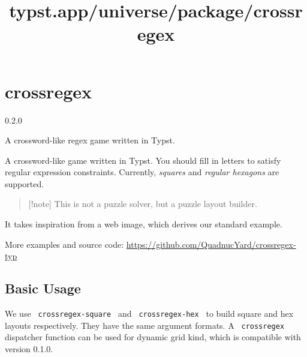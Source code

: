 \title{typst.app/universe/package/crossregex}

\label{banner}
\section{crossregex}\label{crossregex}

{ 0.2.0 }

A crossword-like regex game written in Typst.

\label{readme}
A crossword-like game written in Typst. You should fill in letters to
satisfy regular expression constraints. Currently, \emph{squares} and
\emph{regular hexagons} are supported.

\begin{quote}
{[}!note{]} This is not a puzzle solver, but a puzzle layout builder.
\end{quote}

It takes inspiration from a web image, which derives our standard
example.

\pandocbounded{}

\pandocbounded{}

More examples and source code:
\url{https://github.com/QuadnucYard/crossregex-typ}

\subsection{Basic Usage}\label{basic-usage}

We use \texttt{\ crossregex-square\ } and \texttt{\ crossregex-hex\ } to
build square and hex layouts respectively. They have the same argument
formats. A \texttt{\ crossregex\ } dispatcher function can be used for
dynamic grid kind, which is compatible with version 0.1.0.

